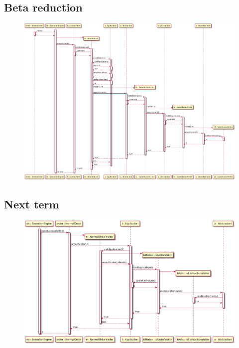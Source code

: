 \subsection{Beta reduction}

\begin{figure}[H]
	\centering
	\includegraphics[width=\textwidth]{sequenceDiagrams/betaReduction}
\end{figure}

\subsection{Next term}

\begin{figure}[H]
	\centering
	\includegraphics[width=\textwidth]{sequenceDiagrams/nextTerm}
\end{figure}

